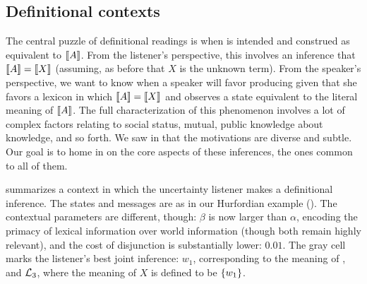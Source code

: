 \documentclass{article}
\begin{document}

\subsection{Definitional contexts}\label{sec:analysis:definitional}

The central puzzle of definitional readings is when  is
intended and construed as equivalent to $\llbracket A\rrbracket$. From the listener's
perspective, this involves an inference that $\llbracket A\rrbracket=\llbracket X\rrbracket$
(assuming, as before that $X$ is the unknown term). From the speaker's
perspective, we want to know when a speaker will favor producing
 given that she favors a lexicon in which
$\llbracket A\rrbracket=\llbracket X\rrbracket$ and observes a state equivalent to the literal
meaning of $\llbracket A\rrbracket$. The full characterization of this phenomenon
involves a lot of complex factors relating to social status, mutual,
public knowledge about knowledge, and so forth. We saw in
 that the motivations are diverse and subtle. Our
goal is to home in on the core aspects of these inferences, the ones
common to all of them.

 summarizes a context in which the uncertainty
listener makes a definitional inference. The states and messages are
as in our Hurfordian example (). The contextual
parameters are different, though: $\beta$ is now larger than $\alpha$,
encoding the primacy of lexical information over world information
(though both remain highly relevant), and the cost of disjunction is
substantially lower: $0.01$. The gray cell marks the listener's best
joint inference: $w_{1}$, corresponding to the meaning of ,
and $\mathcal{L}_{3}$, where the meaning of $X$ is defined to be
$\left\{ w_{1} \right\}$.
\end{document}

